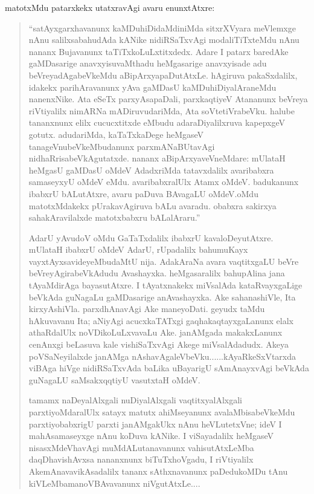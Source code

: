 matotxMdu patarxkekx utatxravAgi avaru enunxtAtxre:
\begin{quote}
``satAyxgarxhavanunx kaMDuhiDidaMdiniMda sitxrXVyara meVlemxge nAnu salilxsa\-bahudAda kANike nidiRSaTxvAgi modaliTiTxteMdu nAnu nananx Buja\-vanunx taTiTxkoLuLxtitxdedx. Adare I patarx baredAke gaMDasarige anavxyisuvaMthadu heMgasarige anavxyisade adu beVreyadAgabeVkeMdu aBipArxyapaDu\-tAtxLe. hAgiruva pakaSxdalilx, idakekx parihAravanunx yAva gaMDasU kaMDu\-hiDiyalAraneMdu nanenxNike. Ata eSeTx parxyAsapaDali, parxkaqtiyeV Ata\-nanunx beVreya riVtiyalilx nimARNa mADiruvudariMda, Ata soVte\-tiVrabeVku. halube tananxnunx elilx cucucxtitxde eMbudu adaraDiyalilxruva kapepxgeV gotutx. adudariMda, kaTaTxkaDege heMgaseV tanageVnubeVkeMbu\-danunx parxmANaBUtavAgi nidhaRrisabeVkAgutatxde. nananx aBipArxya\-veV\-neMdare: mUlataH heMgasU gaMDasU oMdeV AdadxriMda tatavxdalilx ava\-ribabxra samaseyxyU oMdeV eMdu. avaribabxralUlx Atamx oMdeV. badu\-kanunx ibabxrU bALutAtxre, avaru paDuva BAvagaLU oMdeV.\break \hbox{oMdu} matotxM\-dakekx pUrakavAgiruva bALu avaradu. obabxra sakirxya sahakAra\-vilalxde matotxbabxru bALalAraru.''

AdarU yAvudoV oMdu GaTaTxdalilx ibabxrU kavaloDeyutAtxre. mUlataH ibabxrU oMdeV AdarU, rUpadalilx bahumuKayx vayxtAyxsa\-videyeMbudaMtU nija. AdakAraNa avara vaqtitxgaLU beVre beVre\break\-yAgirabeVkAdudu Avashayxka. heMgasaralilx bahupAlina jana tAyaMdi\-rAga bayasutAtxre. I tAyatxnakekx miVsalAda kataRvayxgaLige beVkAda guNagaLu gaMDasarige anAvashayxka. Ake sahanashiVle, Ita kirxyAshiVla. parxdhAnavAgi Ake maneyoDati. geyudx taMdu hAkuvavanu Ita; aNiyAgi acucxkaTATxgi gaqhakaqtayxgaLanunx elalx athaRdalUlx noVDikoLuLxvavaLu Ake. janAMgada makakxLanunx cenAnxgi beLasuva kale vishiSaTxvAgi Akege miVsalAdadudx. Akeya poVSaNeyilalxde janAMga nAshavAgaleVbeVku......kAyaRkeSxVtarxda viBAga hiVge nidiRSaTxvAda baLika uBayarigU sAmAnayxvAgi beVkAda guNagaLU saMsakxqqtiyU vasutxtaH oMdeV.

tamamx naDeyalAlxgali nuDiyalAlxgali vaqtitxyalAlxgali parxtiyoMda\-ralUlx satayx matutx ahiMseyanunx avalaMbisabeVkeMdu parxtiyobabxrigU parxti janAMgakUkx nAnu heVLutetxVne; ideV I mahAsamaseyxge nAnu \hbox{koDuva} kANike. I viSayadalilx heMgaseV nisasxMdeVhavAgi muMdALutana\-vanunx vahisutAtxLeMba daqDhavishAvxsa nananxnunx biTuTxhoVgadu, I riVtiyalilx Ake\break mAnavavikAsadalilx tananx sAthxnavanunx paDedukoMDu tAnu kiVLeMba\break manoVBAvavanunx niVgutAtxLe....



\end{quote}
